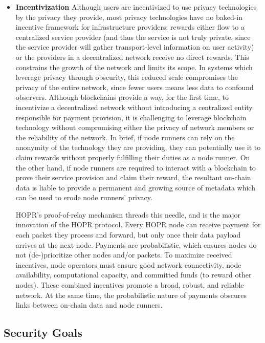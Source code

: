 \begin{itemize}
    \item \textbf{Incentivization}
        Although users are incentivized to use privacy technologies by the privacy they provide, most privacy technologies have no baked-in incentive framework for infrastructure providers: rewards either flow to a centralized service provider (and thus the service is not truly private, since the service provider will gather transport-level information on user activity) or the providers in a decentralized network receive no direct rewards. This constrains the growth of the network and limits its scope. In systems which leverage privacy through obscurity, this reduced scale compromises the privacy of the entire network, since fewer users means less data to confound observers. Although blockchains provide a way, for the first time, to incentivize a decentralized network without introducing a centralized entity responsible for payment provision, it is challenging to leverage blockchain technology without compromising either the privacy of network members or the reliability of the network. In brief, if node runners can rely on the anonymity of the technology they are providing, they can potentially use it to claim rewards without properly fulfilling their duties as a node runner. On the other hand, if node runners are required to interact with a blockchain to prove their service provision and claim their reward, the resultant on-chain data is liable to provide a permanent and growing source of metadata which can be used to erode node runners' privacy.
        
        HOPR's proof-of-relay mechanism threads this needle, and is the major innovation of the HOPR protocol. Every HOPR node can receive payment for each packet they process and forward, but only once their data payload arrives at the next node. Payments are probabilistic, which ensures nodes do not
        (de-)prioritize other nodes and/or packets. To maximize received incentives, node operators must ensure good network connectivity, node availability, computational capacity, and committed funds (to reward other nodes). These combined incentives promote a broad, robust, and reliable network. At the same time, the probabilistic nature of payments obscures links between on-chain data and node runners.

\end{itemize}

\subsection{Security Goals}
\label{sec:securitygoals}

